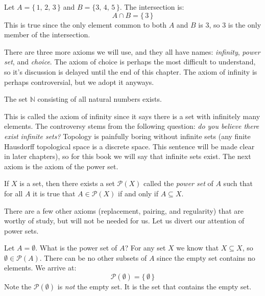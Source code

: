             \begin{example}
                Let $A=\{\,1,\,2,\,3\,\}$ and $B=\{3,\,4,\,5\,\}$. The
                intersection is:
                \begin{equation}
                    A\cap{B}=\{\,3\,\}
                \end{equation}
                This is true since the only element common to both $A$ and
                $B$ is $3$, so $3$ is the only member of the intersection.
            \end{example}
            There are three more axioms we will use, and they all have names:
            \textit{infinity}, \textit{power set}, and \textit{choice}.
            The axiom of choice is perhaps the most difficult to understand,
            so it's discussion is delayed until the end of this chapter. The
            axiom of infinity is perhaps controversial, but we adopt it anyways.
            \begin{axiom}
                The set $\mathbb{N}$ consisting of all natural numbers exists.
            \end{axiom}
            This is called the axiom of infinity since it says there is a set
            with infinitely many elements. The controversy stems from the
            following question:
            \textit{do you believe there exist infinite sets?} Topology is
            painfully boring without infinite sets (any finite Hausdorff
            topological space is a discrete space. This sentence will be made
            clear in later chapters), so for this book we will
            say that infinite sets exist. The next axiom is the axiom of the
            power set.
            \begin{axiom}
                If $X$ is a set, then there exists a set
                $\mathcal{P}(X)$ called the \textit{power set} of $A$ such that
                for all $A$ it is true that $A\in\mathcal{P}(X)$ if and only if
                $A\subseteq{X}$.
            \end{axiom}
            There are a few other axioms (replacement, pairing, and regularity)
            that are worthy of study, but will not be needed for us. Let us
            divert our attention of power sets.
            \begin{example}
                Let $A=\emptyset$. What is the power set of $A$? For any set
                $X$ we know that $X\subseteq{X}$, so
                $\emptyset\in\mathcal{P}(A)$. There can be no other subsets of
                $A$ since the empty set contains no elements. We arrive at:
                \begin{equation}
                    \mathcal{P}(\emptyset)=\{\,\emptyset\,\}
                \end{equation}
                Note the $\mathcal{P}(\emptyset)$ is \textit{not} the empty set.
                It is the set that contains the empty set.
            \end{example}
